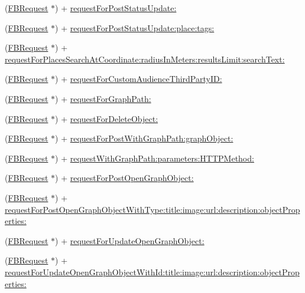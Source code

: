 \begin{DoxyCompactItemize}
\item 
(\hyperlink{interfaceFBRequest}{F\+B\+Request} $\ast$) + \hyperlink{interfaceFBRequest_a0a745a53f4764835bd0945bd66fe10fd}{request\+For\+Post\+Status\+Update\+:}
\item 
(\hyperlink{interfaceFBRequest}{F\+B\+Request} $\ast$) + \hyperlink{interfaceFBRequest_a5560f9786dcf54ca907153c611f991ed}{request\+For\+Post\+Status\+Update\+:place\+:tags\+:}
\item 
(\hyperlink{interfaceFBRequest}{F\+B\+Request} $\ast$) + \hyperlink{interfaceFBRequest_a1965c2185e0d9c98e19d0edd20180ab8}{request\+For\+Places\+Search\+At\+Coordinate\+:radius\+In\+Meters\+:results\+Limit\+:search\+Text\+:}
\item 
(\hyperlink{interfaceFBRequest}{F\+B\+Request} $\ast$) + \hyperlink{interfaceFBRequest_a17f11f5dad042b4109b3a001300d6916}{request\+For\+Custom\+Audience\+Third\+Party\+I\+D\+:}
\item 
(\hyperlink{interfaceFBRequest}{F\+B\+Request} $\ast$) + \hyperlink{interfaceFBRequest_a33356f35896b2f50d96ed24c8ddf5841}{request\+For\+Graph\+Path\+:}
\item 
(\hyperlink{interfaceFBRequest}{F\+B\+Request} $\ast$) + \hyperlink{interfaceFBRequest_a6d457b796765de6b436e5ff6cf11cc44}{request\+For\+Delete\+Object\+:}
\item 
(\hyperlink{interfaceFBRequest}{F\+B\+Request} $\ast$) + \hyperlink{interfaceFBRequest_ac3f506dd49d0757265f44b41c9579c8b}{request\+For\+Post\+With\+Graph\+Path\+:graph\+Object\+:}
\item 
(\hyperlink{interfaceFBRequest}{F\+B\+Request} $\ast$) + \hyperlink{interfaceFBRequest_a2e3ee15f72f7e3380495fcf1660154ce}{request\+With\+Graph\+Path\+:parameters\+:\+H\+T\+T\+P\+Method\+:}
\item 
(\hyperlink{interfaceFBRequest}{F\+B\+Request} $\ast$) + \hyperlink{interfaceFBRequest_a7eed076cb1c83e3dfe4f29ccfebe68b4}{request\+For\+Post\+Open\+Graph\+Object\+:}
\item 
(\hyperlink{interfaceFBRequest}{F\+B\+Request} $\ast$) + \hyperlink{interfaceFBRequest_aa5c66ef020233f0de4a26473a8b7c87b}{request\+For\+Post\+Open\+Graph\+Object\+With\+Type\+:title\+:image\+:url\+:description\+:object\+Properties\+:}
\item 
(\hyperlink{interfaceFBRequest}{F\+B\+Request} $\ast$) + \hyperlink{interfaceFBRequest_ab92e50866d79923cfb17f1f96f06530b}{request\+For\+Update\+Open\+Graph\+Object\+:}
\item 
(\hyperlink{interfaceFBRequest}{F\+B\+Request} $\ast$) + \hyperlink{interfaceFBRequest_a9accf3aae3b94802e07a0358979bf37d}{request\+For\+Update\+Open\+Graph\+Object\+With\+Id\+:title\+:image\+:url\+:description\+:object\+Properties\+:}

\end{DoxyCompactItemize}
